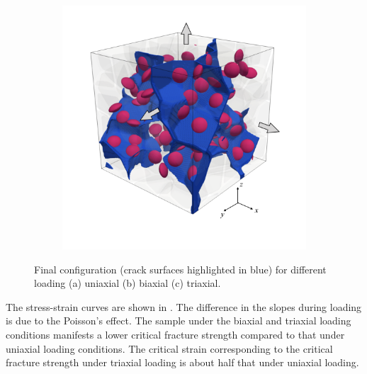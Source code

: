\begin{figure}[!htbp]
\begin{subfigure}{0.32\textwidth}
    \caption{}
    \label{b100_load2}
  \end{subfigure}
  \begin{subfigure}{0.32\textwidth}
    \centering
    \includegraphics[width=\textwidth]{Chapter3/figures/b100_end_xyz}
    \caption{}
    \label{b100_load3}
  \end{subfigure}
  \caption{ Final configuration (crack surfaces highlighted in blue) for different loading (a) uniaxial (b) biaxial (c) triaxial.}
  \label{final_loading}
\end{figure}

The stress-strain curves are shown in . The difference in the slopes during loading is due to the Poisson's effect. The sample under the biaxial and triaxial loading conditions manifests a lower critical fracture strength compared to that under uniaxial loading conditions. The critical strain corresponding to the critical fracture strength under triaxial loading is about half that under uniaxial loading.

